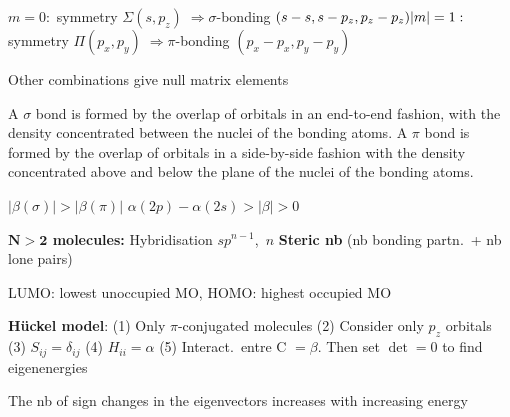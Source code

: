 \begin{squishlist}
    \item
    \begin{minipage}{0.7\columnwidth}
        $m=0 : $ symmetry $ \Sigma (s, p_z) \;  \Longrightarrow \sigma$-bonding $(s-s, s-p_z, p_z-p_z) \\
        |m|=1 : $ symmetry $ \Pi (p_x, p_y) \; \Longrightarrow \pi$-bonding $(p_x-p_x, p_y-p_y)$
    \end{minipage}
    \vline
    \hspace{0.05cm}
    \begin{minipage}{0.3\columnwidth}
        Other combinations give null matrix elements
    \end{minipage}
    \item A $\sigma$ bond is formed by the overlap of orbitals in an end-to-end fashion, with the \elec density concentrated between the nuclei of the bonding atoms. A $\pi$  bond is formed by the overlap of orbitals in a side-by-side fashion with the \elec density concentrated above and below the plane of the nuclei of the bonding atoms.
    \item $|\beta(\sigma)| > |\beta(\pi)|$ \qquad $\alpha(2p) - \alpha(2s) > |\beta| > 0$
\end{squishlist}

\squishline

\begin{squishlist}
    \item \textbf{$\mathbf{N>2}$ molecules:} Hybridisation $sp^{n-1}$,\, $n$ \textbf{Steric nb} (nb bonding partn.\ + nb lone pairs)
    \item LUMO: lowest unoccupied MO, HOMO: highest occupied MO
    \item \textbf{Hückel model}: (1) Only $\pi$-conjugated molecules (2) Consider only $p_z$ orbitals (3) $S_{ij} = \delta_{ij}$ (4) $H_{ii} = \alpha$ (5) Interact.\ entre C $=\beta$. \quad Then set $\det =0$ to find eigenenergies
    \item The nb of sign changes in the eigenvectors increases with increasing energy
\end{squishlist}

\newpage

